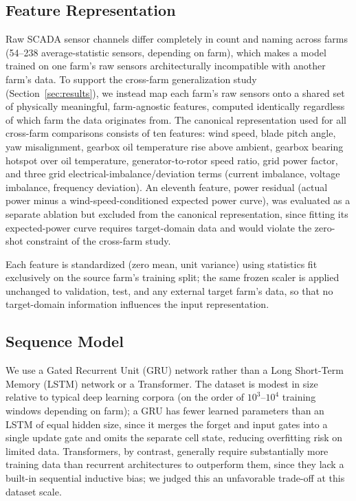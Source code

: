 \documentclass[conference]{IEEEtran}
\begin{document}
\subsection{Feature Representation}

Raw SCADA sensor channels differ completely in count and naming across
farms (54--238 average-statistic sensors, depending on farm), which makes
a model trained on one farm's raw sensors architecturally incompatible
with another farm's data. To support the cross-farm generalization study
(Section~\ref{sec:results}), we instead map each farm's raw sensors onto a
shared set of physically meaningful, farm-agnostic features, computed
identically regardless of which farm the data originates from. The
canonical representation used for all cross-farm comparisons consists of
ten features: wind speed, blade pitch angle, yaw misalignment, gearbox oil
temperature rise above ambient, gearbox bearing hotspot over oil
temperature, generator-to-rotor speed ratio, grid power factor, and three
grid electrical-imbalance/deviation terms (current imbalance, voltage
imbalance, frequency deviation). An eleventh feature, power residual
(actual power minus a wind-speed-conditioned expected power curve), was
evaluated as a separate ablation but excluded from the canonical
representation, since fitting its expected-power curve requires
target-domain data and would violate the zero-shot constraint of the
cross-farm study.

Each feature is standardized (zero mean, unit variance) using statistics
fit exclusively on the source farm's training split; the same frozen
scaler is applied unchanged to validation, test, and any external target
farm's data, so that no target-domain information influences the
input representation.

\subsection{Sequence Model}

We use a Gated Recurrent Unit (GRU) network rather than a Long Short-Term
Memory (LSTM) network or a Transformer. The dataset is modest in size
relative to typical deep learning corpora (on the order of $10^3$--$10^4$
training windows depending on farm); a GRU has fewer learned parameters
than an LSTM of equal hidden size, since it merges the forget and input
gates into a single update gate and omits the separate cell state,
reducing overfitting risk on limited data. Transformers, by contrast,
generally require substantially more training data than recurrent
architectures to outperform them, since they lack a built-in sequential
inductive bias; we judged this an unfavorable trade-off at this dataset
scale.
\end{document}
